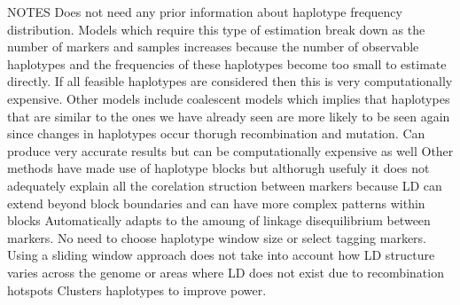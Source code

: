 \documentclass[a4paper,10pt,twoside,abstraction,titlepage]{article}
\begin{document}
NOTES
Does not need any prior information about haplotype frequency distribution. Models which require this type of estimation break down as the number of markers and samples increases because the number of observable haplotypes and the frequencies of these haplotypes become too small to estimate directly. If all feasible haplotypes are considered then this is very computationally expensive.
Other models include coalescent models which implies that haplotypes that are similar to the ones we have already seen are more likely to be seen again since changes in haplotypes occur thorugh recombination and mutation. Can produce very accurate results but can be computationally expensive as well
Other methods have made use of haplotype blocks but althorugh usefuly it does not adequately explain all the corelation struction between markers because LD can extend beyond block boundaries and can have more complex patterns within blocks
Automatically adapts to the amoung of linkage disequilibrium between markers.  No need to choose haplotype window size or select tagging markers.
Using a sliding window approach does not take into account how LD structure varies across the genome or areas where LD does not exist due to recombination hotspots 
Clusters haplotypes to improve power.
\end{document}
